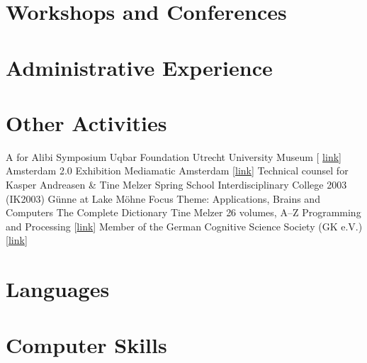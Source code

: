 \documentclass[10pt,a4paper,sans]{moderncv}
\begin{document}
%
%

\section{Workshops and Conferences}


\section{Administrative Experience}


\section{Other Activities}
        {A for Alibi Symposium}
        {}
        {Uqbar Foundation}
        {Utrecht University Museum [%
        \href{http://www.sternbergpress.com/?pageId=1204}{link}]}
        {}	
        {Amsterdam 2.0 Exhibition}
        {}
        {Mediamatic}
        {Amsterdam [\href{http://www.mediamatic.net/artefact-9850-en.html}%
        {link}]}
        {Technical counsel for Kasper Andreasen \& Tine Melzer}
        {Spring School}
        {}
        {Interdisciplinary College 2003 (IK2003)}
        {G\"{u}nne at Lake M\"{o}hne}
        {Focus Theme: Applications, Brains and Computers}
        {The Complete Dictionary}
        {}
        {Tine Melzer}
        {26 volumes, A--Z}
        {Programming and Processing
        [\href{http://www.tinemelzer.eu/works/the-complete-dictionary/}
        {link}]}
        {Member of the German Cognitive Science Society (GK e.V.)}
        {}
        {}
        {[\href{http://www.gk-ev.de}{link}]}
        {}


\section{Languages}


\section{Computer Skills}


\clearpage
\end{document}
